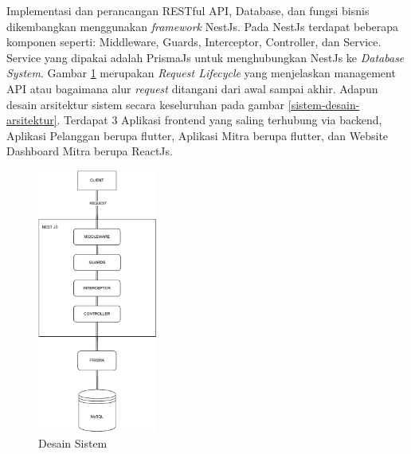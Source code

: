Implementasi dan perancangan RESTful API, Database, dan fungsi bisnis dikembangkan menggunakan \textit{framework} NestJs. Pada NestJs terdapat beberapa komponen seperti: Middleware, Guards, Interceptor, Controller, dan Service. Service yang dipakai adalah PrismaJs untuk menghubungkan NestJs ke \textit{Database System}. Gambar \ref{sistem-desain} merupakan \textit{Request Lifecycle} yang menjelaskan management API atau bagaimana alur \textit{request} ditangani dari awal sampai akhir. Adapun desain arsitektur sistem secara keseluruhan pada gambar \ref{sistem-desain-arsitektur}. Terdapat 3 Aplikasi frontend yang saling terhubung via backend, Aplikasi Pelanggan berupa flutter, Aplikasi Mitra berupa flutter, dan Website Dashboard Mitra berupa ReactJs. 
\begin{figure}[h]
	\centering
	\includegraphics[width=0.35\textwidth]{drawio/sistem-desain.drawio.pdf}
	\caption{Desain Sistem}
	\label{sistem-desain}
\end{figure}
